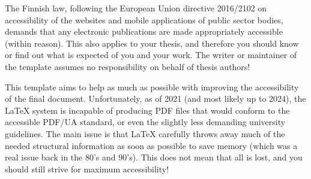 The Finnish law, following the European Union directive 2016/2102 on accessibility of the websites and mobile applications of public sector bodies, demands that any electronic publications are made appropriately accessible (within reason). This also applies to your thesis, and therefore you should know or find out what is expected of you and your work. The writer or maintainer of the template assumes no responsibility on behalf of thesis authors!

This template aims to help as much as possible with improving the accessibility of the final document. Unfortunately, as of 2021 (and most likely up to 2024), the \LaTeX{} system is incapable of producing PDF files that would conform to the accessible PDF/UA standard, or even the slightly less demanding university guidelines. The main issue is that \LaTeX{} carefully throws away much of the needed structural information as soon as possible to save memory (which was a real issue back in the 80's and 90's). This does not mean that all is lost, and you should still strive for maximum accessibility!

